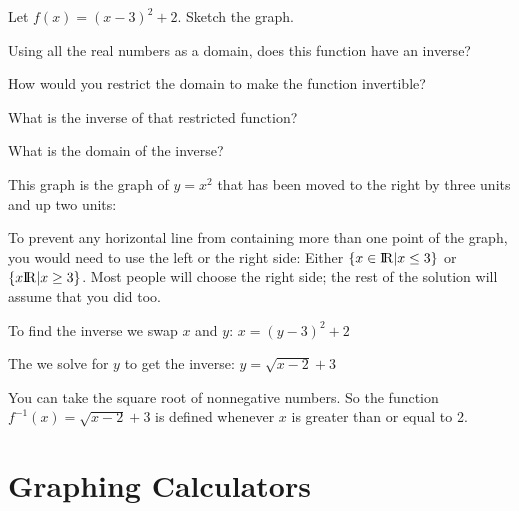 \begin{Exercise}[title={Find the inverse}, label=simple_inverse]

  Let $f(x) = (x - 3)^2 + 2$.  Sketch the graph.

  Using all the real numbers as a domain, does this function have an inverse?

  How would you restrict the domain to make the function invertible?

  What is the inverse of that restricted function?

  What is the domain of the inverse?

\end{Exercise}
\begin{Answer}[ref=simple_inverse]

  This graph is the graph of $y = x^2$ that has been moved to the right by three units and up two units:
 

To prevent any horizontal line from containing more than one point of
the graph, you would need to use the left or the right side: Either
$\{x \in {\rm I\!R}  | x \leq 3\}$ or $\{x {\rm I\!R}| x \geq 3\}$. Most people will choose the
right side; the rest of the solution will assume that you did too.

To find the inverse we swap $x$ and $y$: $x = (y -3)^2 + 2$

The we solve for $y$ to get the inverse: $y = \sqrt{x - 2} + 3$

You can take the square root of nonnegative numbers. So the function
$f^{-1}(x) = \sqrt{x - 2} + 3$ is defined whenever $x$ is greater than
or equal to 2.

\end{Answer}

\section{Graphing Calculators}

